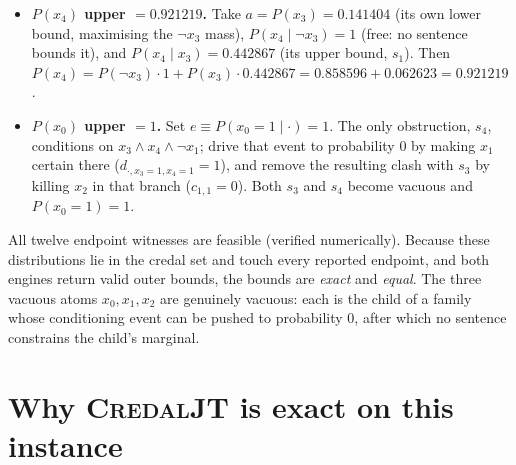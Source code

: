 \documentclass[11pt]{article}
\begin{document}
\begin{itemize}
\item \textbf{$P(x_4)$ upper $=0.921219$.} Take $a=P(x_3)=0.141404$ (its own
lower bound, maximising the $\lnot x_3$ mass), $P(x_4\mid \lnot x_3)=1$ (free:
no sentence bounds it), and $P(x_4\mid x_3)=0.442867$ (its upper bound, $s_1$).
Then $P(x_4)=P(\lnot x_3)\cdot 1 + P(x_3)\cdot 0.442867
= 0.858596 + 0.062623 = 0.921219$.
\item \textbf{$P(x_0)$ upper $=1$.} Set $e\equiv P(x_0{=}1\mid\cdot)=1$. The only
obstruction, $s_4$, conditions on $x_3\land x_4\land\lnot x_1$; drive that event
to probability $0$ by making $x_1$ certain there ($d_{\cdot,x_3=1,x_4=1}=1$),
and remove the resulting clash with $s_3$ by killing $x_2$ in that branch
($c_{1,1}=0$). Both $s_3$ and $s_4$ become vacuous and $P(x_0{=}1)=1$.
\end{itemize}

All twelve endpoint witnesses are feasible (verified numerically). Because these
distributions lie in the credal set and touch every reported endpoint, and both
engines return valid outer bounds, the bounds are \emph{exact} and \emph{equal}.
The three vacuous atoms $x_0,x_1,x_2$ are genuinely vacuous: each is the child of
a family whose conditioning event can be pushed to probability $0$, after which
no sentence constrains the child's marginal.

\section{Why \textsc{CredalJT} is exact on this instance}
\label{sec:why}
\end{document}
